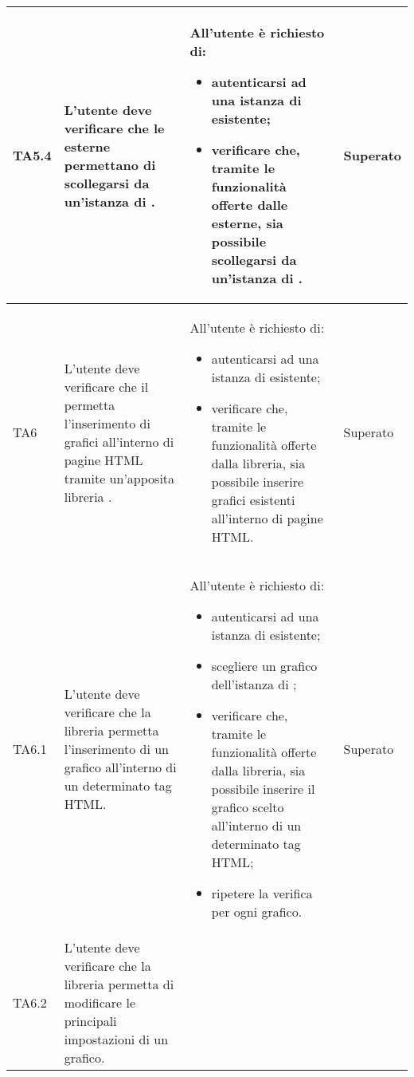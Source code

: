 \begin{longtabu}{| X[0.5] | X | X | X[0.5] |}
	TA5.4 & L'utente  deve verificare che le  esterne permettano di scollegarsi  da un'istanza di \projectname{}.
		
		& All'utente  è richiesto di:
		\begin{itemize}
			\item autenticarsi ad una istanza di \projectname{} esistente;
			\item verificare che, tramite le funzionalità offerte dalle  esterne, sia possibile scollegarsi da un'istanza di \projectname{}.
		\end{itemize}
& Superato \\ \hline

	TA6 & L'utente  deve verificare che il  permetta l'inserimento di grafici all'interno di pagine HTML tramite un'apposita libreria .
		
		& All'utente  è richiesto di:
		\begin{itemize}
			\item autenticarsi ad una istanza di \projectname{} esistente;
			\item verificare che, tramite le funzionalità offerte dalla libreria, sia possibile inserire grafici esistenti all'interno di pagine HTML.
		\end{itemize}
& Superato \\ \hline

	TA6.1 & L'utente  deve verificare che la libreria permetta l'inserimento di un grafico all'interno di un determinato tag HTML.
		
		& All'utente  è richiesto di:
		\begin{itemize}
			\item autenticarsi ad una istanza di \projectname{} esistente;
			\item scegliere un grafico dell'istanza di \projectname{};
			\item verificare che, tramite le funzionalità offerte dalla libreria, sia possibile inserire il grafico scelto all'interno di un determinato tag HTML;
			\item ripetere la verifica per ogni grafico.
		\end{itemize}
& Superato \\ \hline

	TA6.2 & L'utente  deve verificare che la libreria permetta di modificare le principali impostazioni di un grafico.
		

\end{longtabu}
